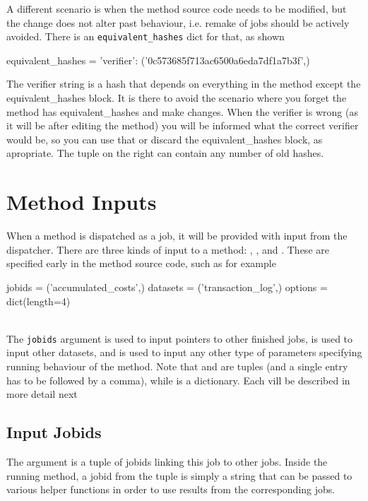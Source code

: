 A different scenario is when the method source code needs to be
modified, but the change does not alter past behaviour, i.e. remake of
jobs should be actively avoided.  There is an
\texttt{equivalent\_hashes} dict for that, as shown
\\
\begin{python}
  equivalent_hashes = {'verifier': ('0c573685f713ac6500a6eda7df1a7b3f',)}
\end{python}

The verifier string is a hash that depends on everything in the method
except the equivalent\_hashes block. It is there to avoid the scenario
where you forget the method has equivalent\_hashes and make changes. When
the verifier is wrong (as it will be after editing the method) you will be
informed what the correct verifier would be, so you can use that or discard
the equivalent\_hashes block, as apropriate. The tuple on the right can
contain any number of old hashes.



\section{Method Inputs}

When a method is dispatched as a job, it will be provided with input
from the dispatcher.  There are three kinds of input to a method:
\jobids, \datasets, and \options.  These are specified early in the
method source code, such as for example
\\
\begin{python}
jobids = ('accumulated_costs',)
datasets = ('transaction_log',)
options = dict(length=4)
\end{python}
\\
The \texttt{jobids} argument is used to input pointers to other
finished jobs, \datasets is used to input other datasets, and \options
is used to input any other type of parameters specifying running
behaviour of the method.  Note that \jobids and \datasets are tuples
(and a single entry has to be followed by a comma), while \options is
a dictionary.  Each vill be described in more detail next



\subsection{Input Jobids}
The \jobids argument is a tuple of jobids linking this job to other
jobs.  Inside the running method, a jobid from the \jobids tuple is
simply a string that can be passed to various helper functions in
order to use results from the corresponding jobs.



